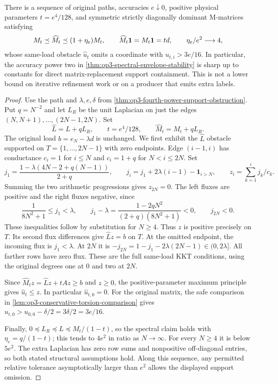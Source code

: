 \begin{proposition}
\label{prop:op3-spectral-envelope-path-obstruction}
There is a sequence of original paths, accuracies $e\downarrow0$, positive
physical parameters $t=e^4/128$, and symmetric strictly diagonally dominant
M-matrices satisfying
\[
 M_t\preceq\widehat M_t\preceq(1+\eta_e)M_t,
 \qquad \widehat M_t\mathbf{1}=M_t\mathbf{1}=td,
 \qquad \eta_e/e^2\longrightarrow4,
\]
whose same-load obstacle $\widehat u_t$ omits a coordinate with
$u_{t,i}>3e/16$. In particular, the accuracy power two in
\cref{thm:op3-spectral-envelope-stability} is sharp up to constants
for direct matrix-replacement support containment. This is not a lower
bound on iterative refinement work or on a producer that emits extra labels.
\end{proposition}
\begin{proof}
Use the path and $\lambda,e,\delta$ from
\cref{thm:op3-fourth-power-support-obstruction}. Put $q=N^{-2}$ and
let $L_R$ be the unit Laplacian on just the edges
$(N,N+1),\ldots,(2N-1,2N)$. Set
\[
 \widehat L=L+qL_R,\qquad
 t=e^4/128,\qquad \widehat M_t=M_t+qL_R.
\]
The original load $b=e_N-\lambda d$ is unchanged.
We first exhibit the $\widehat L$ obstacle supported on
$T=\{1,\ldots,2N-1\}$ with zero endpoints. Edge $(i-1,i)$ has
conductance $c_i=1$ for $i\leq N$ and $c_i=1+q$ for $N<i\leq2N$.
Set
\[
 j_1=\frac{1-\lambda(4N-2+q(N-1))}{2+q},\qquad
 j_i=j_1+2\lambda(i-1)-\boldsymbol1_{i>N},\qquad
 z_i=\sum_{k=1}^i j_k/c_k.
\]
Summing the two arithmetic progressions gives $z_{2N}=0$.
The left fluxes are positive and the right fluxes negative, since
\[
 \frac1{8N^2+1}\leq j_1<\lambda,
 \qquad
 j_1-\lambda=\frac{1-2qN^2}{(2+q)(8N^2+1)}<0,
 \qquad j_{2N}<0.
\]
These inequalities follow by substitution for $N\geq4$.
Thus $z$ is positive precisely on $T$. Its second flux differences
give $\widehat Lz=b$ on $T$. At the omitted endpoint, the incoming
flux is $j_1<\lambda$. At $2N$ it is
$-j_{2N}=1-j_1-2\lambda(2N-1)\in(0,2\lambda]$.
All farther rows have zero flux. These are the full same-load KKT
conditions, using the original degrees one at $0$ and two at $2N$.

Since $\widehat M_tz=\widehat Lz+tAz\geq b$ and $z\geq0$,
the positive-parameter maximum principle gives $\widehat u_t\leq z$.
In particular $\widehat u_{t,0}=0$. For the original matrix, the safe
comparison in \cref{lem:op3-conservative-torsion-comparison} gives
$u_{t,0}>u_{0,0}-\delta/2=3\delta/2=3e/16$.

Finally, $0\preceq L_R\preceq L\preceq M_t/(1-t)$, so the
spectral claim holds with $\eta_e=q/(1-t)$; this tends to $4e^2$
in ratio as $N\to\infty$. For every $N\geq4$ it is below $5e^2$.
The extra Laplacian has zero row sums and nonpositive off-diagonal entries,
so both stated structural assumptions hold. Along this sequence, any
permitted relative tolerance asymptotically larger than $e^2$ allows
the displayed support omission.
\end{proof}

